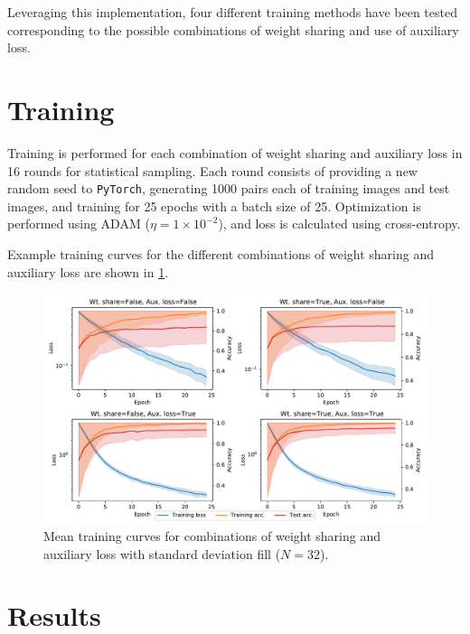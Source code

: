 \documentclass[prl, article, twocolumn]{revtex4-1}
\begin{document}
Leveraging this implementation, four different training methods have been tested corresponding to the possible combinations of weight sharing and use of auxiliary loss.

\section{Training}
Training is performed for each combination of weight sharing and auxiliary loss in 16 rounds for statistical sampling. Each round consists of providing a new random seed to \texttt{PyTorch}, generating 1000 pairs each of training images and test images, and training for 25 epochs with a batch size of 25. Optimization is performed using ADAM ($\eta = 1\times10^{-2}$), and loss is calculated using cross-entropy.

Example training curves for the different combinations of weight sharing and auxiliary loss are shown in \ref{fig:training-curves}.

\begin{figure}[b]
    \centering
    \includegraphics[width=\linewidth]{figures/avg_histories.pdf}
    \caption{Mean training curves for combinations of weight sharing and auxiliary loss with standard deviation fill ($N=32$).}
    \label{fig:training-curves}
\end{figure}


\section{Results}
\end{document}
